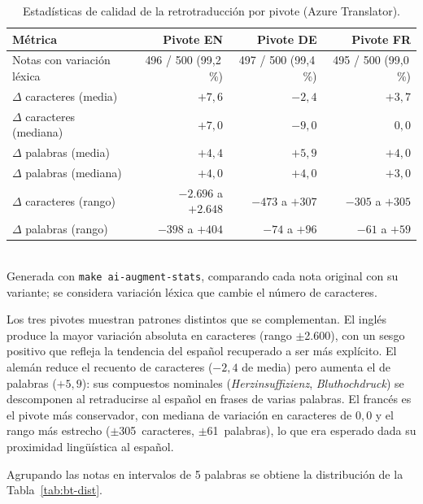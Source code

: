 \begin{table}[h]
\centering
\small
\caption{Estadísticas de calidad de la retrotraducción por pivote (Azure Translator).}
\label{tab:bt-quality}
\begin{tabular}{lrrr}
\hline
\textbf{Métrica} & \textbf{Pivote EN} & \textbf{Pivote DE} & \textbf{Pivote FR} \\
\hline
Notas con variación léxica  & 496 / 500 (99,2\,\%) & 497 / 500 (99,4\,\%) & 495 / 500 (99,0\,\%) \\
$\Delta$ caracteres (media)      & $+7{,}6$  & $-2{,}4$  & $+3{,}7$  \\
$\Delta$ caracteres (mediana)    & $+7{,}0$  & $-9{,}0$  & $0{,}0$   \\
$\Delta$ palabras (media)   & $+4{,}4$  & $+5{,}9$  & $+4{,}0$  \\
$\Delta$ palabras (mediana) & $+4{,}0$  & $+4{,}0$  & $+3{,}0$  \\
$\Delta$ caracteres (rango)      & $-2{.}696$ a $+2{.}648$ & $-473$ a $+307$ & $-305$ a $+305$ \\
$\Delta$ palabras (rango)   & $-398$ a $+404$     & $-74$ a $+96$   & $-61$ a $+59$   \\
\hline
\end{tabular}
\\[4pt]
{\footnotesize Generada con \texttt{make ai-augment-stats}, comparando cada nota original con su variante; se considera variación léxica que cambie el número de caracteres.}
\end{table}

Los tres pivotes muestran patrones distintos que se complementan. El inglés produce la mayor variación absoluta en caracteres (rango $\pm$2.600), con un sesgo positivo que refleja la tendencia del español recuperado a ser más explícito. El alemán reduce el recuento de caracteres ($-2{,}4$ de media) pero aumenta el de palabras ($+5{,}9$): sus compuestos nominales (\emph{Herzinsuffizienz}, \emph{Bluthochdruck}) se descomponen al retraducirse al español en frases de varias palabras. El francés es el pivote más conservador, con mediana de variación en caracteres de $0{,}0$ y el rango más estrecho ($\pm$305~caracteres, $\pm$61~palabras), lo que era esperado dada su proximidad lingüística al español.

Agrupando las notas en intervalos de 5 palabras se obtiene la distribución de la Tabla~\ref{tab:bt-dist}.

